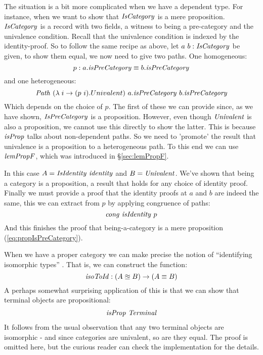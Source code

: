 The situation is a bit more complicated when we have a dependent type. For
instance, when we want to show that $\IsCategory$ is a mere proposition.
$\IsCategory$ is a record with two fields, a witness to being a pre-category and
the univalence condition. Recall that the univalence condition is indexed by the
identity-proof. So to follow the same recipe as above, let $a\ b \tp
\IsCategory$ be given, to show them equal, we now need to give two paths. One homogeneous:
%
$$
p \tp a.\isPreCategory \equiv b.\isPreCategory
$$
%
and one heterogeneous:
%
$$
\Path\ (\lambda\; i \to (p\ i).Univalent)\ a.\isPreCategory\ b.\isPreCategory
$$
%
Which depends on the choice of $p$. The first of these we can provide since, as
we have shown, $\IsPreCategory$ is a proposition. However, even though
$\Univalent$ is also a proposition, we cannot use this directly to show the
latter. This is because $\isProp$ talks about non-dependent paths. So we need to
'promote' the result that univalence is a proposition to a heterogeneous path.
To this end we can use $\lemPropF$, which was introduced in \S\ref{sec:lemPropF}.

In this case $A = \var{IsIdentity}\ \identity$ and $B = \Univalent$. We've
shown that being a category is a proposition, a result that holds for any choice
of identity proof. Finally we must provide a proof that the identity proofs at
$a$ and $b$ are indeed the same, this we can extract from $p$ by applying
congruence of paths:
%
$$
\congruence\ \isIdentity\ p
$$
%
And this finishes the proof that being-a-category is a mere proposition
(\ref{eq:propIsPreCategory}).

When we have a proper category we can make precise the notion of ``identifying
isomorphic types'' . That is, we can construct the
function:
%
$$
\isoToId \tp (A \approxeq B) \to (A \equiv B)
$$
%
A perhaps somewhat surprising application of this is that we can show that
terminal objects are propositional:
%
\begin{align}
\label{eq:termProp}
\isProp\ \var{Terminal}
\end{align}
%
It follows from the usual observation that any two terminal objects are
isomorphic - and since categories are univalent, so are they equal. The proof is
omitted here, but the curious reader can check the implementation for the
details. 

